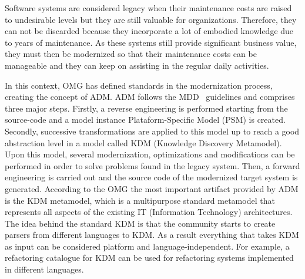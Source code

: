 Software systems are considered legacy when their maintenance costs are raised to undesirable levels but they are still valuable for organizations. Therefore, they can not be discarded because they incorporate a lot of embodied knowledge due to years of maintenance. As these systems still provide significant business value, they must then be modernized so that their maintenance costs can be manageable and they can keep on assisting in the regular daily activities. 


In this context, OMG has defined standards in the modernization process, creating the concept of ADM. ADM follows the MDD~\cite{5440163} guidelines and comprises three major steps. Firstly, a reverse engineering is performed starting from the source-code and a model instance Plataform-Specific Model (PSM) is created. Secondly, successive transformations are applied to this model up to reach a good abstraction level in a model called KDM (Knowledge Discovery Metamodel). Upon this model, several modernization, optimizations and modifications can be performed in order to solve problems found in the legacy system. Then, a forward engineering is carried out and the source code of the modernized target system is generated. According to the OMG the most important artifact provided by ADM is the KDM metamodel, which is a multipurpose standard metamodel that represents all aspects of the existing IT (Information  Technology) architectures. The idea behind the standard KDM is that the community starts to create parsers from different languages to KDM. As a result everything that takes KDM as input can be considered platform and language-independent. For example, a refactoring catalogue for KDM can be used for refactoring systems implemented in different languages. 

